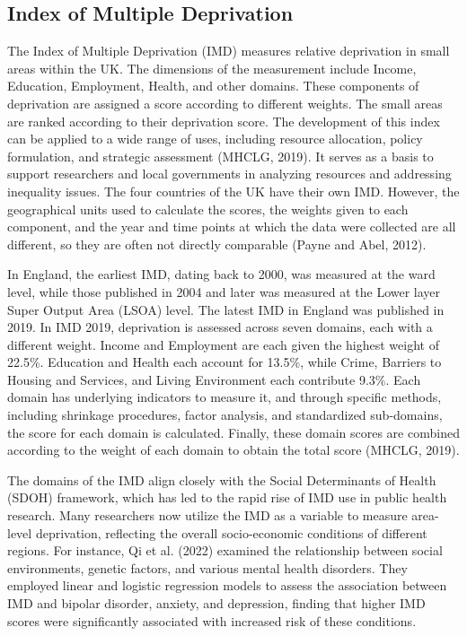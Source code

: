 \subsection{Index of Multiple Deprivation}
\label{sec:2.4.1}
The Index of Multiple Deprivation (IMD) measures relative deprivation in small areas within the UK. The dimensions of the measurement include Income, Education, Employment, Health, and other domains. These components of deprivation are assigned a score according to different weights. The small areas are ranked according to their deprivation score. The development of this index can be applied to a wide range of uses, including resource allocation, policy formulation, and strategic assessment (MHCLG, 2019). It serves as a basis to support researchers and local governments in analyzing resources and addressing inequality issues. The four countries of the UK have their own IMD. However, the geographical units used to calculate the scores, the weights given to each component, and the year and time points at which the data were collected are all different, so they are often not directly comparable (Payne and Abel, 2012).

In England, the earliest IMD, dating back to 2000, was measured at the ward level, while those published in 2004 and later was measured at the Lower layer Super Output Area (LSOA) level. The latest IMD in England was published in 2019. In IMD 2019, deprivation is assessed across seven domains, each with a different weight. Income and Employment are each given the highest weight of 22.5\%. Education and Health each account for 13.5\%, while Crime, Barriers to Housing and Services, and Living Environment each contribute 9.3\%. Each domain has underlying indicators to measure it, and through specific methods, including shrinkage procedures, factor analysis, and standardized sub-domains, the score for each domain is calculated. Finally, these domain scores are combined according to the weight of each domain to obtain the total score (MHCLG, 2019).

The domains of the IMD align closely with the Social Determinants of Health (SDOH) framework, which has led to the rapid rise of IMD use in public health research. Many researchers now utilize the IMD as a variable to measure area-level deprivation, reflecting the overall socio-economic conditions of different regions. For instance, Qi et al. (2022) examined the relationship between social environments, genetic factors, and various mental health disorders. They employed linear and logistic regression models to assess the association between IMD and bipolar disorder, anxiety, and depression, finding that higher IMD scores were significantly associated with increased risk of these conditions.

